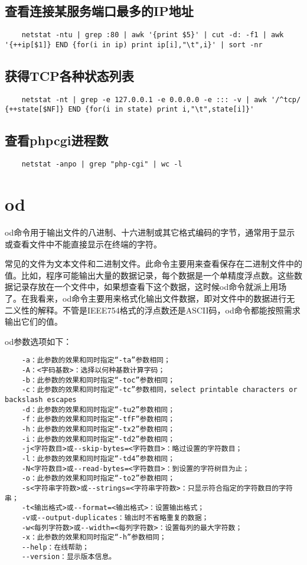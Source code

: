 \documentclass[a4paper,left=2.5cm,right=2.5cm,11pt]{article}
\begin{document}
\subsection{查看连接某服务端口最多的IP地址}
	\begin{lstlisting}
	netstat -ntu | grep :80 | awk '{print $5}' | cut -d: -f1 | awk '{++ip[$1]} END {for(i in ip) print ip[i],"\t",i}' | sort -nr
	\end{lstlisting}

\subsection{获得TCP各种状态列表}
	\begin{lstlisting}
	netstat -nt | grep -e 127.0.0.1 -e 0.0.0.0 -e ::: -v | awk '/^tcp/ {++state[$NF]} END {for(i in state) print i,"\t",state[i]}'
	\end{lstlisting}

\subsection{查看phpcgi进程数}
	\begin{lstlisting}
	netstat -anpo | grep "php-cgi" | wc -l
	\end{lstlisting}

\section{od}
	od命令用于输出文件的八进制、十六进制或其它格式编码的字节，通常用于显示或查看文件中不能直接显示在终端的字符。\par
	常见的文件为文本文件和二进制文件。此命令主要用来查看保存在二进制文件中的值。比如，程序可能输出大量的数据记录，每个数据是一个单精度浮点数。这些数据记录存放在一个文件中，如果想查看下这个数据，这时候od命令就派上用场了。在我看来，od命令主要用来格式化输出文件数据，即对文件中的数据进行无二义性的解释。不管是IEEE754格式的浮点数还是ASCII码，od命令都能按照需求输出它们的值。\par

	od参数选项如下：
	\begin{lstlisting}
	-a：此参数的效果和同时指定“-ta”参数相同； 
	-A：<字码基数>：选择以何种基数计算字码； 
	-b：此参数的效果和同时指定“-toc”参数相同； 
	-c：此参数的效果和同时指定“-tc”参数相同，select printable characters or backslash escapes 
	-d：此参数的效果和同时指定“-tu2”参数相同； 
	-f：此参数的效果和同时指定“-tfF”参数相同； 
	-h：此参数的效果和同时指定“-tx2”参数相同； 
	-i：此参数的效果和同时指定“-td2”参数相同； 
	-j<字符数目>或--skip-bytes=<字符数目>：略过设置的字符数目； 
	-l：此参数的效果和同时指定“-td4”参数相同； 
	-N<字符数目>或--read-bytes=<字符数目>：到设置的字符树目为止； 
	-o：此参数的效果和同时指定“-to2”参数相同； 
	-s<字符串字符数>或--strings=<字符串字符数>：只显示符合指定的字符数目的字符串； 
	-t<输出格式>或--format=<输出格式>：设置输出格式； 
	-v或--output-duplicates：输出时不省略重复的数据； 
	-w<每列字符数>或--width=<每列字符数>：设置每列的最大字符数； 
	-x：此参数的效果和同时指定“-h”参数相同； 
	--help：在线帮助； 
	--version：显示版本信息。
	\end{lstlisting}
\end{document}
